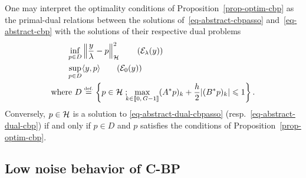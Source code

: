 One may interpret the optimality conditions of Proposition~\ref{prop-optim-cbp} as the primal-dual relations between the solutions of~\eqref{eq-abstract-cbpasso} and~\eqref{eq-abstract-cbp} with the solutions of their respective dual problems
\begin{align}
  \inf_{p\in D} &\normH{\frac{y}{\la}-p}^2 \tag{$\Ee_\la(y)$}\label{eq-abstract-dual-cbpasso}\\
  \sup_{p\in D} &\langle y, p\rangle \tag{$\Ee_0(y)$}\label{eq-abstract-dual-cbp}\\
  \text{where } D&\eqdef\enscond{p\in \Hh}{\!\!\!\!\max_{k\in\seg{0}{\taillegrid-1}}(\OpU^*p)_k+\frac{\stepsize}{2}|(\OpD^*p)_k| \leq 1}.
\end{align}
Conversely, $p\in\mathcal{H}$ is a solution to \eqref{eq-abstract-dual-cbpasso} (resp.~\eqref{eq-abstract-dual-cbp}) if and only if $p\in D$ and $p$ satisfies the conditions of Proposition~\ref{prop-optim-cbp}.


\subsection{Low noise behavior of C-BP}

